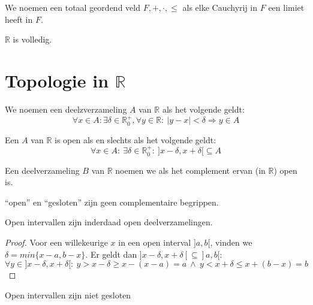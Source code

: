 \documentclass[main.tex]{subfiles}
\begin{document}
\begin{de}
  We noemen een totaal geordend veld $F,+,\cdot,\le$  als elke Cauchyrij in $F$ een limiet heeft in $F$.
\end{de}

\begin{opm}
  $\mathbb{R}$ is volledig.
\end{opm}


\section{Topologie in $\mathbb{R}$}
\label{sec:topologie-mathbbr}

\begin{de}
  We noemen een deelzverzameling $A$ van $\mathbb{R}$  als het volgende geldt:
  \[ \forall x\in A: \exists \delta \in \mathbb{R}_{0}^{+}, \forall y\in \mathbb{R}:\ |y-x| < \delta \Rightarrow y\in A \]
\end{de}

\begin{st}
  Een $A$ van $\mathbb{R}$ is open als en slechts als het volgende geldt:
  \[ \forall x\in A:\ \exists \delta \in \mathbb{R}_{0}^{+}:\ ]x-\delta,x+\delta[ \subseteq A \]

\end{st}

\begin{de}
  Een deelverzameling $B$ van $\mathbb{R}$ noemen we  als het complement ervan (in $\mathbb{R}$) open is.
\end{de}

\begin{opm}
  ``open'' en ``gesloten'' zijn geen complementaire begrippen.
\end{opm}

\begin{st}
  Open intervallen zijn inderdaad open deelverzamelingen.

  \begin{proof}
    Voor een willekeurige $x$ in een open interval $]a,b[$, vinden we $\delta = min\{x-a,b-x\}$.
    Er geldt dan $]x-\delta,x+\delta[ \subseteq ]a,b[$:
    \[ \forall y\in ]x-\delta,x+\delta[:\ y > x-\delta \ge x-(x-a) = a \ \wedge\ y < x+\delta \le x+(b-x) = b \]
  \end{proof}
\end{st}

\begin{st}
  Open intervallen zijn niet gesloten
\end{st}
\end{document}
